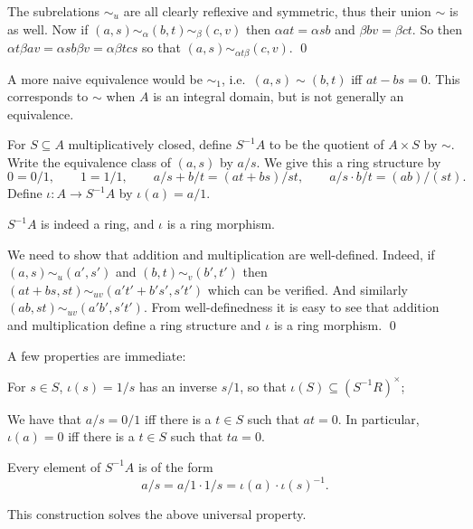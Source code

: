     The subrelations $\sim_u$ are all clearly reflexive and symmetric, thus their union $\sim$ is as well.
    Now if $(a,s)\sim_\alpha(b,t)\sim_\beta(c,v)$ then $\alpha at=\alpha sb$ and $\beta bv=\beta ct$.
    So then $\alpha t\beta av=\alpha sb\beta v=\alpha\beta tcs$ so that $(a,s)\sim_{\alpha t\beta}(c,v)$.
    \qed

\eproof

\bexam

    A more naive equivalence would be $\sim_1$, i.e.\ $(a,s)\sim(b,t)$ iff $at-bs=0$.
    This corresponds to $\sim$ when $A$ is an integral domain, but is not generally an equivalence.

\eexam

\bdefn

    For $S\subseteq A$ multiplicatively closed, define $S^{-1}A$ to be the quotient of $A\times S$ by $\sim$.
    Write the equivalence class of $(a,s)$ by $a/s$.
    We give this a ring structure by
    $$ 0 = 0/1,\qquad 1 = 1/1,\qquad a/s + b/t = (at+bs)/st,\qquad a/s \cdot b/t = (ab)/(st) . $$
    Define $\iota\colon A\to S^{-1}A$ by $\iota(a)=a/1$.

\edefn

\bprop

    $S^{-1}A$ is indeed a ring, and $\iota$ is a ring morphism.

\eprop

\bproof

    We need to show that addition and multiplication are well-defined.
    Indeed, if $(a,s)\sim_u(a',s')$ and $(b,t)\sim_v(b',t')$ then $(at+bs,st)\sim_{uv}(a't'+b's',s't')$ which can be verified.
    And similarly $(ab,st)\sim_{uv}(a'b',s't')$.
    From well-definedness it is easy to see that addition and multiplication define a ring structure and $\iota$ is a ring morphism.
    \qed

\eproof

A few properties are immediate:
\benum
    \item For $s\in S$, $\iota(s)=1/s$ has an inverse $s/1$, so that $\iota(S)\subseteq(S^{-1}R)^\times$;
    \item We have that $a/s=0/1$ iff there is a $t\in S$ such that $at=0$.
    In particular, $\iota(a)=0$ iff there is a $t\in S$ such that $ta=0$.
    \item Every element of $S^{-1}A$ is of the form
    $$ a/s = a/1\cdot1/s = \iota(a)\cdot\iota(s)^{-1} . $$
\eenum

\bthrm

    This construction solves the above universal property.

